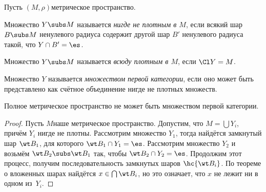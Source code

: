 \documentclass[a4paper]{article}
\begin{document}
Пусть $(M, \rho)$\т метрическое пространство.

\begin{df}
Множество $Y \subs M$ называется \emph{нигде не плотным в $M$}, если всякий шар $B \subs M$ ненулевого радиуса
содержит другой шар $B'$ ненулевого радиуса такой, что $Y \cap B' = \es$.
\end{df}

\begin{df}
Множество $Y \subs M$ называется \emph{всюду плотным в $M$}, если $\Cl Y = M$.
\end{df}

\begin{df}
Множество $Y$ называется \emph{множеством первой категории}, если оно может быть представлено как счётное
объединение нигде не плотных множеств.
\end{df}

\begin{theorem}
Полное метрическое пространство не может быть множеством первой категории.
\end{theorem}
\begin{proof}
Пусть $M$\т наше метрическое пространство. Допустим, что $M = \bigcup Y_i$, причём $Y_i$ нигде не плотны.
Рассмотрим множество $Y_1$, тогда найдётся замкнутый шар $\wt B_1$, для которого $\wt B_1 \cap Y_1 = \es$.
Рассмотрим множество $Y_2$ и возьмём $\wt B_2 \subs \wt B_1$ так, чтобы $\wt B_2 \cap Y_2 = \es$.
Продолжим этот процесс, получим последовательность замкнутых шаров $\hc{\wt B_i}$. По теореме о вложенных шарах
найдётся $x \in \bigcap \wt B_i$, но это означает, что $x$ не лежит ни в одном из~$Y_i$.
\end{proof}
\end{document}

